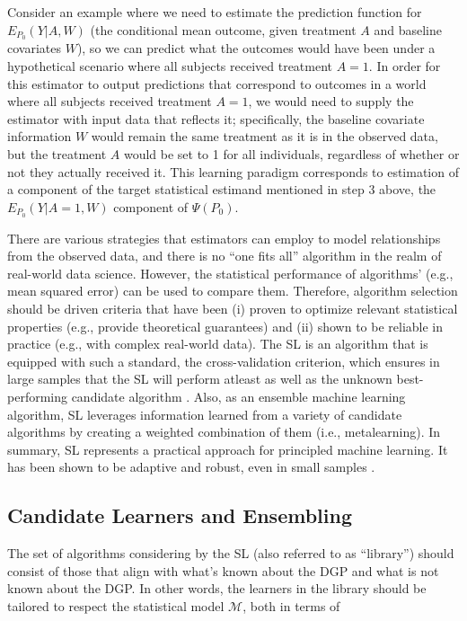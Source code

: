 \documentclass[
  12pt, krantz2,
]{krantz}
\theoremstyle{definition}
\theoremstyle{definition}
\theoremstyle{definition}
\newcommand{\1}{\mathbbm{1}}
\begin{document}
Consider an example where we need to estimate the prediction function for
\(E_{P_0}(Y|A,W)\) (the conditional mean outcome, given treatment \(A\) and
baseline covariates \(W\)), so we can predict what the outcomes would have been
under a hypothetical scenario where all subjects received treatment \(A=1\). In
order for this estimator to output predictions that correspond to outcomes in
a world where all subjects received treatment \(A=1\), we would need to supply
the estimator with input data that reflects it; specifically, the baseline
covariate information \(W\) would remain the same treatment as it is in the
observed data, but the treatment \(A\) would be set to 1 for all individuals,
regardless of whether or not they actually received it. This learning paradigm
corresponds to estimation of a component of the target statistical estimand
mentioned in step 3 above, the \(E_{P_0}(Y|A=1,W)\) component of \(\Psi(P_0)\).

There are various strategies that estimators can employ to model relationships
from the observed data, and there is no ``one fits all'' algorithm in the realm
of real-world data science. However, the statistical performance of algorithms'
(e.g., mean squared error) can be used to compare them. Therefore, algorithm
selection should be driven criteria that have been (i) proven to optimize
relevant statistical properties (e.g., provide theoretical guarantees) and (ii)
shown to be reliable in practice (e.g., with complex real-world data). The SL
is an algorithm that is equipped with such a standard, the cross-validation
criterion, which ensures in large samples that the SL will perform atleast as
well as the unknown best-performing candidate algorithm \citep{vdl2003unified, vaart2006oracle, vdl2007super}. Also, as an ensemble machine learning
algorithm, SL leverages information learned from a variety of candidate
algorithms by creating a weighted combination of
them (i.e., metalearning). In summary, SL represents a practical approach for
principled machine learning. It has been shown to be adaptive and robust, even
in small samples \citep{polley2010super}.

\hypertarget{candidate-learners-and-ensembling}{%
\subsection{Candidate Learners and Ensembling}\label{candidate-learners-and-ensembling}}

The set of algorithms considering by the SL (also referred to as ``library'')
should consist of those that align with what's known about the DGP and what is
not known about the DGP. In other words, the learners in the library should
be tailored to respect the statistical model \(\mathcal{M}\), both in terms of
\end{document}
